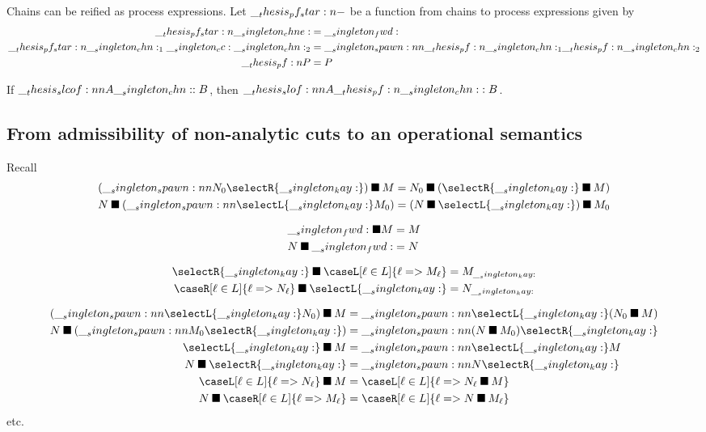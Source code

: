 Chains can be reified as process expressions.
Let $\pf*{-}$ be a function from chains to process expressions given by 
\begin{align*}
    \pf*{\chne} &= \fwd \\
    \pf*{\chn_1 \cc \chn_2} &= \spawn{\pf{\chn_1}}{\pf{\chn_2}} \\
    \pf{P} &= P
\end{align*}

\begin{theorem}
  If $\slcof{A |- \chn : B}$, then $\slof{A |- \pf{\chn} : B}$.
\end{theorem}

\subsection{From admissibility of non-analytic cuts to an operational semantics}

Recall 
\begin{gather*}
  \begin{aligned}
    \nspawn{(\spawn{N_0}{\selectR{\kay}})}{M}
      &= \nspawn{N_0}{(\nspawn{\selectR{\kay}}{M})}
    \\
    \nspawn{N}{(\spawn{\selectL{\kay}}{M_0})}
      &= \nspawn{(\nspawn{N}{\selectL{\kay}})}{M_0}
  \end{aligned}
  \\[2\jot]
  \begin{aligned}
    \nspawn{\fwd}{M}
      &= M
    \\
    \nspawn{N}{\fwd}
      &= N
  \end{aligned}
  \\[2\jot]
  \begin{aligned}
    \nspawn{\selectR{\kay}}{\caseL[\ell \in L]{\ell => M_{\ell}}}
      &= M_{\kay}
    \\
    \nspawn{\caseR[\ell \in L]{\ell => N_{\ell}}}{\selectL{\kay}}
      &= N_{\kay}
  \end{aligned}
  \\[2\jot]
  \begin{aligned}
    \nspawn{(\spawn{\selectL{\kay}}{N_0})}{M}
      &= \spawn{\selectL{\kay}}{(\nspawn{N_0}{M})}
    \\
    \nspawn{N}{(\spawn{M_0}{\selectR{\kay}})}
      &= \spawn{(\nspawn{N}{M_0})}{\selectR{\kay}}
    \\
    \nspawn{\selectL{\kay}}{M}
      &= \spawn{\selectL{\kay}}{M}
    \\
    \nspawn{N}{\selectR{\kay}}
      &= \spawn{N}{\selectR{\kay}}
    \\
    \nspawn{\caseL[\ell \in L]{\ell => N_{\ell}}}{M}
      &= \caseL[\ell \in L]{\ell => \nspawn{N_{\ell}}{M}}
    \\
    \nspawn{N}{\caseR[\ell \in L]{\ell => M_{\ell}}}
      &= \caseR[\ell \in L]{\ell => \nspawn{N}{M_{\ell}}}
  \end{aligned}
\end{gather*}
etc.

